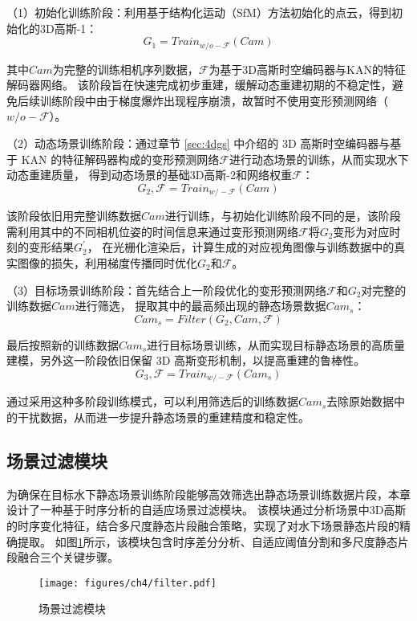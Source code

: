 （1）初始化训练阶段：利用基于结构化运动（SfM）方法\cite{sfm1}\cite{sfm2}初始化的点云，得到初始化的3D高斯-1：
\begin{equation}
    G_1 = Train_{w/o-\mathcal{F} }(Cam)
\end{equation}

其中$Cam$为完整的训练相机序列数据，$\mathcal{F}$为基于3D高斯时空编码器与KAN的特征解码器网络。
该阶段旨在快速完成初步重建，缓解动态重建初期的不稳定性，避免后续训练阶段中由于梯度爆炸出现程序崩溃，故暂时不使用变形预测网络（$w/o-\mathcal{F}$）。

（2）动态场景训练阶段：通过章节 \ref{sec:4dgs} 中介绍的 3D 高斯时空编码器与基于 KAN 的特征解码器构成的变形预测网络$\mathcal{F}$进行动态场景的训练，从而实现水下动态重建质量，
得到动态场景的基础3D高斯-2和网络权重$\mathcal{F}$：
\begin{equation}
    G_2, \mathcal{F} = Train_{w/-\mathcal{F} }(Cam)
\end{equation}

该阶段依旧用完整训练数据$Cam$进行训练，与初始化训练阶段不同的是，该阶段需利用其中的不同相机位姿的时间信息来通过变形预测网络$\mathcal{F}$将$G_2$变形为对应时刻的变形结果$G_2^\prime$，
在光栅化渲染后，计算生成的对应视角图像与训练数据中的真实图像的损失，利用梯度传播同时优化$G_2$和$\mathcal{F}$。

（3）目标场景训练阶段：首先结合上一阶段优化的变形预测网络$\mathcal{F}$和$G_2$对完整的训练数据$Cam$进行筛选，
提取其中的最高频出现的静态场景数据$Cam_s$：
\begin{equation}
    Cam_s = Filter(G_2, Cam, \mathcal{F})
\end{equation}

最后按照新的训练数据$Cam_s$进行目标场景训练，从而实现目标静态场景的高质量建模，另外这一阶段依旧保留 3D 高斯变形机制，以提高重建的鲁棒性。
\begin{equation}
    G_3, \mathcal{F} = Train_{w/-\mathcal{F} }(Cam_s)
\end{equation}

通过采用这种多阶段训练模式，可以利用筛选后的训练数据$Cam_s$去除原始数据中的干扰数据，从而进一步提升静态场景的重建精度和稳定性。

\subsection{场景过滤模块}
为确保在目标水下静态场景训练阶段能够高效筛选出静态场景训练数据片段，本章设计了一种基于时序分析的自适应场景过滤模块。
该模块通过分析场景中3D高斯的时序变化特征，结合多尺度静态片段融合策略，实现了对水下场景静态片段的精确提取。
如图\ref{img:filter}所示，该模块包含时序差分分析、自适应阈值分割和多尺度静态片段融合三个关键步骤。
\begin{figure}[htbp]
    \vspace{4mm}
    \centering
    \texttt{[image: figures/ch4/filter.pdf]}
    \caption{场景过滤模块}
    \label{img:filter}
\end{figure}

